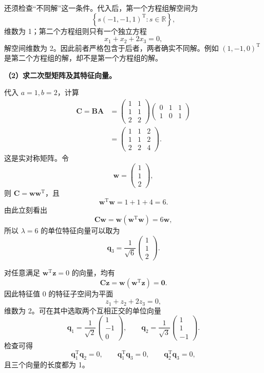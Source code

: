 \documentclass[UTF8,11pt,fontset=windows]{ctexart}
\begin{document}
还须检查“不同解”这一条件。代入后，第一个方程组解空间为
$$
\left\{s(-1,-1,1)^{\mathrm T}:s\in\mathbb R\right\},
$$
维数为 1；第二个方程组则只有一个独立方程
$$
x_1+x_2+2x_3=0,
$$
解空间维数为 2。因此前者严格包含于后者，两者确实不同解。例如 $(1,-1,0)^{\mathrm T}$ 是第二个方程组的解，却不是第一个方程组的解。

\textbf{（2）求二次型矩阵及其特征向量。}

代入 $a=1,b=2$，计算
$$
\begin{aligned}
\boldsymbol C=\boldsymbol B\boldsymbol A
&=\begin{pmatrix}1&1\\1&1\\2&2\end{pmatrix}
\begin{pmatrix}0&1&1\\1&0&1\end{pmatrix}\\[3pt]
&=\begin{pmatrix}1&1&2\\1&1&2\\2&2&4\end{pmatrix}.
\end{aligned}
$$
这是实对称矩阵。令
$$
\boldsymbol w=\begin{pmatrix}1\\1\\2\end{pmatrix},
$$
则 $\boldsymbol C=\boldsymbol w\boldsymbol w^{\mathrm T}$，且
$$
\boldsymbol w^{\mathrm T}\boldsymbol w=1+1+4=6.
$$
由此立刻看出
$$
\boldsymbol C\boldsymbol w
=\boldsymbol w(\boldsymbol w^{\mathrm T}\boldsymbol w)
=6\boldsymbol w,
$$
所以 $\lambda=6$ 的单位特征向量可以取为
$$
\boldsymbol q_3=\frac1{\sqrt6}\begin{pmatrix}1\\1\\2\end{pmatrix}.
$$

对任意满足 $\boldsymbol w^{\mathrm T}\boldsymbol z=0$ 的向量，均有
$$
\boldsymbol C\boldsymbol z
=\boldsymbol w(\boldsymbol w^{\mathrm T}\boldsymbol z)
=\boldsymbol0.
$$
因此特征值 0 的特征子空间为平面
$$
z_1+z_2+2z_3=0,
$$
维数为 2。可在其中选取两个互相正交的单位向量
$$
\boldsymbol q_1=\frac1{\sqrt2}\begin{pmatrix}1\\-1\\0\end{pmatrix},
\qquad
\boldsymbol q_2=\frac1{\sqrt3}\begin{pmatrix}1\\1\\-1\end{pmatrix}.
$$
检查可得
$$
\boldsymbol q_1^{\mathrm T}\boldsymbol q_2=0,
\qquad
\boldsymbol q_1^{\mathrm T}\boldsymbol q_3=0,
\qquad
\boldsymbol q_2^{\mathrm T}\boldsymbol q_3=0,
$$
且三个向量的长度都为 1。
\end{document}
